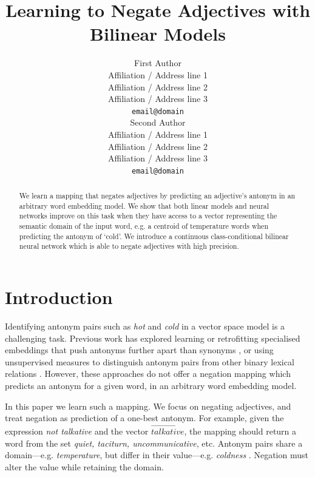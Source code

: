 \documentclass[11pt]{article}
\title{Learning to Negate Adjectives with Bilinear Models}
\author{First Author \\
  Affiliation / Address line 1 \\
  Affiliation / Address line 2 \\
  Affiliation / Address line 3 \\
  {\tt email@domain} \\\And
  Second Author \\
  Affiliation / Address line 1 \\
  Affiliation / Address line 2 \\
  Affiliation / Address line 3 \\
  {\tt email@domain} \\}
\date{}
\begin{document}
\maketitle
\begin{abstract}
We learn a mapping that negates adjectives by
predicting an adjective's antonym in an arbitrary word embedding
model. We show that both linear models and neural networks improve on
this task when they have access to a vector representing the semantic
domain of the input word, e.g. a centroid of temperature words when
predicting the antonym of `cold'. We introduce a continuous
class-conditional bilinear neural network which is able to negate
adjectives with high precision.
\end{abstract}

\section{Introduction}

Identifying antonym pairs such as {\it hot} and {\it cold} in a vector space model is a challenging task.
Previous work has explored learning or retrofitting specialised embeddings that push antonyms further apart than synonyms
\citep{pham:15,nguyen:16,mrksic:16}, or using
unsupervised measures to distinguish antonym pairs from other
binary lexical relations \citep{santus:15}. 
However, these approaches do not offer a negation mapping which predicts an antonym for a given word, in an arbitrary word embedding model. 

In this paper we learn such a mapping.
We focus on negating adjectives, and treat negation as prediction of a
one-best antonym. For example, given the expression {\it not
  talkative} and the vector $\overrightarrow{\textit{talkative}}$, the mapping should return a word from the set {\it quiet, taciturn,
  uncommunicative}, etc.
Antonym pairs share a domain---e.g. {\it   temperature}, but differ in their value---e.g. {\it coldness}
\citep{turney:12,hermann:13}. Negation must alter the value while retaining the domain.
\end{document}
